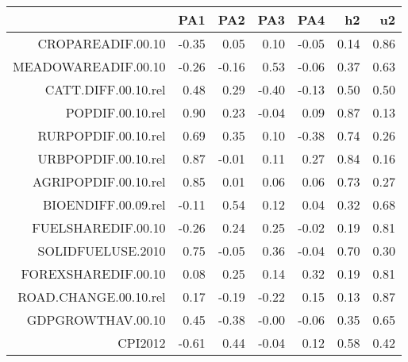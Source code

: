 \begin{table}[ht]
\centering
\begin{tabular}{rrrrrrr}
  \hline
 & PA1 & PA2 & PA3 & PA4 & h2 & u2 \\ 
  \hline
CROPAREADIF.00.10 & -0.35 & 0.05 & 0.10 & -0.05 & 0.14 & 0.86 \\ 
  MEADOWAREADIF.00.10 & -0.26 & -0.16 & 0.53 & -0.06 & 0.37 & 0.63 \\ 
  CATT.DIFF.00.10.rel & 0.48 & 0.29 & -0.40 & -0.13 & 0.50 & 0.50 \\ 
  POPDIF.00.10.rel & 0.90 & 0.23 & -0.04 & 0.09 & 0.87 & 0.13 \\ 
  RURPOPDIF.00.10.rel & 0.69 & 0.35 & 0.10 & -0.38 & 0.74 & 0.26 \\ 
  URBPOPDIF.00.10.rel & 0.87 & -0.01 & 0.11 & 0.27 & 0.84 & 0.16 \\ 
  AGRIPOPDIF.00.10.rel & 0.85 & 0.01 & 0.06 & 0.06 & 0.73 & 0.27 \\ 
  BIOENDIFF.00.09.rel & -0.11 & 0.54 & 0.12 & 0.04 & 0.32 & 0.68 \\ 
  FUELSHAREDIF.00.10 & -0.26 & 0.24 & 0.25 & -0.02 & 0.19 & 0.81 \\ 
  SOLIDFUELUSE.2010 & 0.75 & -0.05 & 0.36 & -0.04 & 0.70 & 0.30 \\ 
  FOREXSHAREDIF.00.10 & 0.08 & 0.25 & 0.14 & 0.32 & 0.19 & 0.81 \\ 
  ROAD.CHANGE.00.10.rel & 0.17 & -0.19 & -0.22 & 0.15 & 0.13 & 0.87 \\ 
  GDPGROWTHAV.00.10 & 0.45 & -0.38 & -0.00 & -0.06 & 0.35 & 0.65 \\ 
  CPI2012 & -0.61 & 0.44 & -0.04 & 0.12 & 0.58 & 0.42 \\ 
   \hline
\end{tabular}
\end{table}

